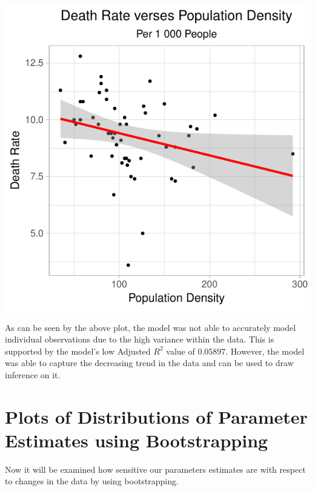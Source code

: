 \documentclass[12pt,]{article}
\begin{document}
\begin{center}\includegraphics{report_files/figure-latex/fitted_val_plot-1} \end{center}

As can be seen by the above plot, the model was not able to accurately
model individual observations due to the high variance within the data.
This is supported by the model's low Adjusted \(R^2\) value of
\(0.05897\). However, the model was able to capture the decreasing trend
in the data and can be used to draw inference on it.

\section{Plots of Distributions of Parameter Estimates using
Bootstrapping}\label{plots-of-distributions-of-parameter-estimates-using-bootstrapping}

Now it will be examined how sensitive our parameters estimates are with
respect to changes in the data by using bootstrapping.
\end{document}
